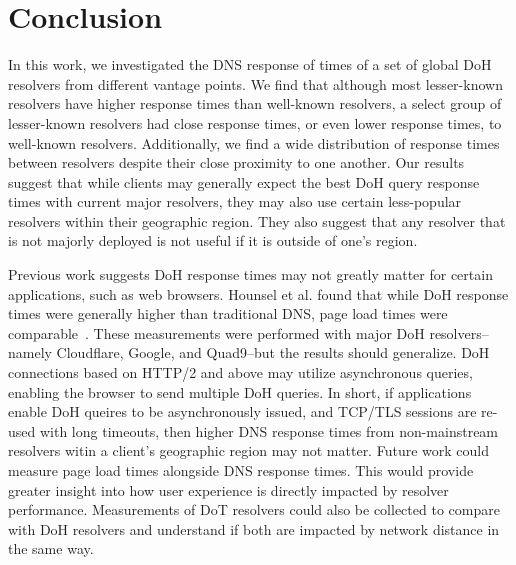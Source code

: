 \section{Conclusion}\label{sec:conclusion}

In this work, we investigated the DNS response of times of a set of global DoH
resolvers from different vantage points.  We find that although most
lesser-known resolvers have higher response times than well-known resolvers, a
select group of lesser-known resolvers had close response times, or even lower
response times, to well-known resolvers.  Additionally, we find a wide
distribution of response times between resolvers despite their close proximity
to one another. Our results suggest that while clients may generally expect the 
best DoH query response times with current major resolvers, they may also use 
certain less-popular resolvers within their geographic region. They also 
suggest that any resolver that is not majorly deployed is not useful if it 
is outside of one's region.

Previous work suggests DoH response times may not greatly matter for certain applications, such as web browsers.
Hounsel et al. found that while DoH response times were generally higher than traditional DNS, page load times were comparable~\cite{hounsel2020comparing}.
These measurements were performed with major DoH resolvers--namely Cloudflare, Google, and Quad9--but the results should generalize.
DoH connections based on HTTP/2 and above may utilize asynchronous queries, enabling the browser to send multiple DoH queries.
In short, if applications enable DoH queires to be asynchronously issued, and TCP/TLS sessions are re-used with long timeouts, then higher DNS response times from non-mainstream resolvers witin a client's geographic region may not matter.
Future work could measure page load times alongside DNS response times.  This
would provide greater insight into how user experience is directly impacted by
resolver performance.  Measurements of DoT resolvers could also be collected
to compare with DoH resolvers and understand if both are impacted by network
distance in the same way. 
